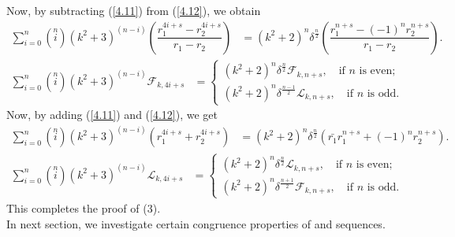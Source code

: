 Now, by subtracting (\ref{4.11}) from (\ref{4.12}), we obtain \\
\begin{align*}
\sum\limits_{i=0}^{n}\left( \stackrel{n}{i}\right)(k^2+3)^{(n-i)}(\dfrac{r_1^{4i+s}-r_2^{4i+s}}{r_1-r_2})&=(k^2+2)^n\delta^{\frac{n}{2}}(\dfrac{r_1^{n+s}-(-1)^nr_2^{n+s}}{r_1-r_2}).
\end{align*}
\begin{align*}
\sum\limits_{i=0}^{n}\left( \stackrel{n}{i}\right)(k^2+3)^{(n-i)}\mathcal{F}_{k,4i+s}&=\begin{cases} 
(k^2+2)^n\delta^{\frac{n}{2}}\mathcal{F}_{k,n+s},\quad \text{if $n$ is even;}\\
(k^2+2)^n\delta^{\frac{n-1}{2}}\mathcal{L}_{k,n+s},\quad \text{if $n$ is odd.}\end{cases} 
\end{align*}
Now, by adding (\ref{4.11}) and (\ref{4.12}), we get \\
\begin{align*}
\sum\limits_{i=0}^{n}\left( \stackrel{n}{i}\right)(k^2+3)^{(n-i)}(r_1^{4i+s}+r_2^{4i+s})&=(k^2+2)^n\delta^{\frac{n}{2}}(\bar{r_{1}}r_1^{n+s}+(-1)^nr_2^{n+s}).
\end{align*}
\begin{align*}
\sum\limits_{i=0}^{n}\left( \stackrel{n}{i}\right)(k^2+3)^{(n-i)}\mathcal{L}_{k,4i+s}&=\begin{cases} 
(k^2+2)^n\delta^{\frac{n}{2}}\mathcal{L}_{k,n+s},\quad \text{if $n$ is even;}\\
(k^2+2)^n\delta^{\frac{n+1}{2}}\mathcal{F}_{k,n+s},\quad \text{if $n$ is odd.}
\end{cases}
\end{align*}
This completes the proof of (3).\\
In next section, we investigate certain congruence properties of \kF\vspace{0mm}  and \kL\vspace{0mm}  sequences. 
